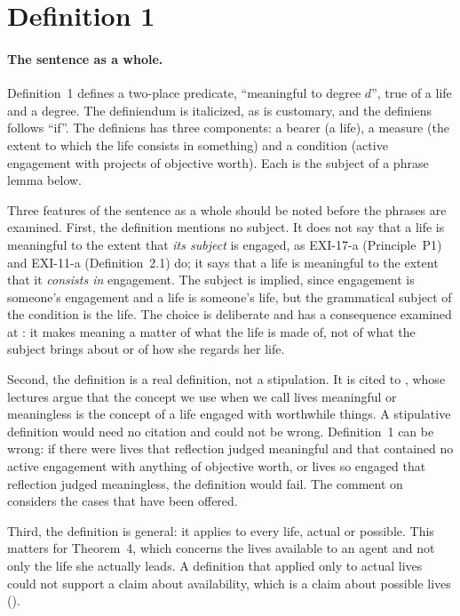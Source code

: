 \section{Definition 1}\label{s:def}


\paragraph{The sentence as a whole.} Definition~1 defines a two-place predicate, \enquote{meaningful to degree $d$}, true of a life and a degree. The definiendum is italicized, as is customary, and the definiens follows \enquote{if}. The definiens has three components: a bearer (a life), a measure (the extent to which the life consists in something) and a condition (active engagement with projects of objective worth). Each is the subject of a phrase lemma below.

Three features of the sentence as a whole should be noted before the phrases are examined. First, the definition mentions no subject. It does not say that a life is meaningful to the extent that \emph{its subject} is engaged, as EXI-17-a (Principle~P1) and EXI-11-a (Definition~2.1) do; it says that a life is meaningful to the extent that it \emph{consists in} engagement. The subject is implied, since engagement is someone's engagement and a life is someone's life, but the grammatical subject of the condition is the life. The choice is deliberate and has a consequence examined at : it makes meaning a matter of what the life is made of, not of what the subject brings about or of how she regards her life.

Second, the definition is a real definition, not a stipulation. It is cited to \citet{Wolf2010}, whose lectures argue that the concept we use when we call lives meaningful or meaningless is the concept of a life engaged with worthwhile things. A stipulative definition would need no citation and could not be wrong. Definition~1 can be wrong: if there were lives that reflection judged meaningful and that contained no active engagement with anything of objective worth, or lives so engaged that reflection judged meaningless, the definition would fail. The comment on  considers the cases that have been offered.

Third, the definition is general: it applies to every life, actual or possible. This matters for Theorem~4, which concerns the lives available to an agent and not only the life she actually leads. A definition that applied only to actual lives could not support a claim about availability, which is a claim about possible lives ().


